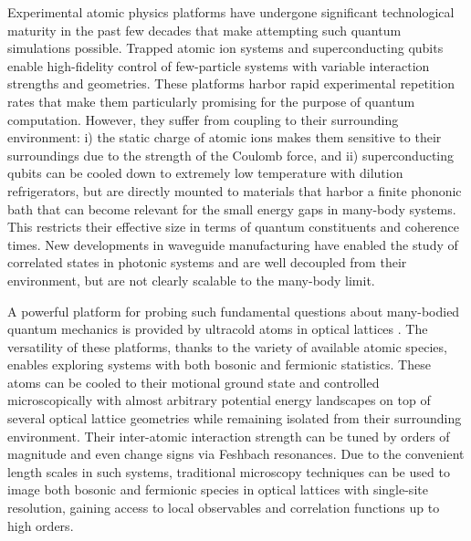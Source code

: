 Experimental atomic physics platforms have undergone significant technological maturity in the past few decades that make attempting such quantum simulations possible. Trapped atomic ion systems \cite{Blatt2012} and superconducting qubits \cite{Houck2012} enable high-fidelity control of few-particle systems with variable interaction strengths and geometries. These platforms harbor rapid experimental repetition rates that make them particularly promising for the purpose of quantum computation. However, they suffer from coupling to their surrounding environment: i) the static charge of atomic ions makes them sensitive to their surroundings due to the strength of the Coulomb force, and ii) superconducting qubits can be cooled down to extremely low temperature with dilution refrigerators, but are directly mounted to materials that harbor a finite phononic bath that can become relevant for the small energy gaps in many-body systems. This restricts their effective size in terms of quantum constituents and coherence times. New developments in waveguide manufacturing have enabled the study of correlated states in photonic systems and are well decoupled from their environment\cite{Garanovich2012}, but are not clearly scalable to the many-body limit. 

A powerful platform for probing such fundamental questions about many-bodied quantum mechanics is provided by ultracold atoms in optical lattices \cite{Bloch2008,Bloch2012}. The versatility of these platforms, thanks to the variety of available atomic species, enables exploring systems with both bosonic and fermionic statistics. These atoms can be cooled to their motional ground state and controlled microscopically with almost arbitrary potential energy landscapes on top of several optical lattice geometries while remaining isolated from their surrounding environment\cite{Lewenstein2012}. Their inter-atomic interaction strength can be tuned by orders of magnitude and even change signs via Feshbach resonances\cite{Chin2010}. Due to the convenient length scales in such systems, traditional microscopy techniques can be used to image both bosonic\cite{Bakr2009,Sherson2010,Miranda2015} and fermionic\cite{Haller2015,Parsons2015,Cheuk2015} species in optical lattices with single-site resolution, gaining access to local observables and correlation functions\cite{Endres2011} up to high orders\cite{Rispoli2018}.

